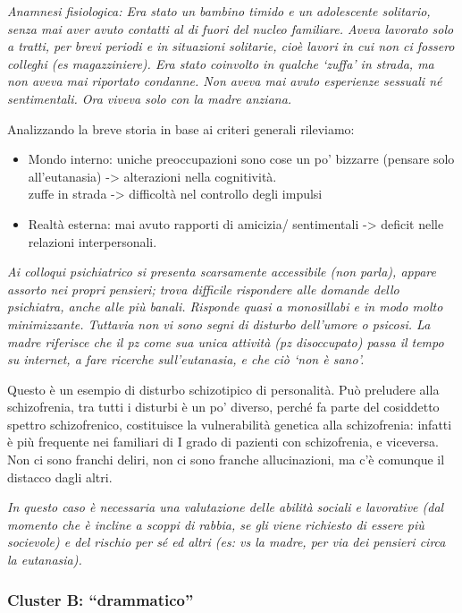 \emph{Anamnesi fisiologica: Era stato un bambino timido e un adolescente
solitario, senza mai aver avuto contatti al di fuori del nucleo
familiare. Aveva lavorato solo a tratti, per brevi periodi e in
situazioni solitarie, cioè lavori in cui non ci fossero colleghi (es
magazziniere). Era stato coinvolto in qualche `zuffa' in strada, ma non
aveva mai riportato condanne. Non aveva mai avuto esperienze sessuali né
sentimentali. Ora viveva solo con la madre anziana.}

Analizzando la breve storia in base ai criteri generali rileviamo:

\begin{itemize}
\item
  Mondo interno: uniche preoccupazioni sono cose un po' bizzarre
  (pensare solo all'eutanasia) -\textgreater{} alterazioni nella
  cognitività.\\
  zuffe in strada -\textgreater{} difficoltà nel controllo degli impulsi
\item
  Realtà esterna: mai avuto rapporti di amicizia/ sentimentali
  -\textgreater{} deficit nelle relazioni interpersonali.
\end{itemize}

\emph{Ai colloqui psichiatrico si presenta scarsamente accessibile (non
parla), appare assorto nei propri pensieri; trova difficile rispondere
alle domande dello psichiatra, anche alle più banali. Risponde quasi a
monosillabi e in modo molto minimizzante. Tuttavia non vi sono segni di
disturbo dell'umore o psicosi. La madre riferisce che il pz come sua
unica attività (pz disoccupato) passa il tempo su internet, a fare
ricerche sull'eutanasia, e che ciò `non è sano'.}

Questo è un esempio di disturbo schizotipico di personalità. Può
preludere alla schizofrenia, tra tutti i disturbi è un po' diverso,
perché fa parte del cosiddetto spettro schizofrenico, costituisce la
vulnerabilità genetica alla schizofrenia: infatti è più frequente nei
familiari di I grado di pazienti con schizofrenia, e viceversa. Non ci
sono franchi deliri, non ci sono franche allucinazioni, ma c'è comunque
il distacco dagli altri.

\emph{In questo caso è necessaria una valutazione delle abilità sociali
e lavorative (dal momento che è incline a scoppi di rabbia, se gli viene
richiesto di essere più socievole) e del rischio per sé ed altri (es: vs
la madre, per via dei pensieri circa la eutanasia).}

\subsubsection{Cluster B: ``drammatico''}

